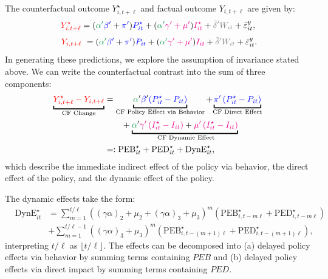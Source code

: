 \documentclass[11pt,reqno,letter]{amsart}
\theoremstyle{definition}
\def\bcolor{\color{ForestGreen}}
\def\pcolor{\color{blue}}
\def\icolor{\color{magenta}}
\def\wcolor{\color{gray}}
\def\ycolor{\color{red}}
\begin{document}
The counterfactual outcome $Y^\star_{i,t+\ell}$  and  factual outcome $Y_{i,t+\ell}$  are given by:
$$
 {\ycolor Y^\star_{i,t+\ell}} = ( {\bcolor\alpha '} {\pcolor \beta'}  + {\pcolor\pi'})
    {\pcolor P^\star_{it}} + ({\bcolor\alpha '}  {\icolor \gamma' + \mu'})
    {\icolor I^\star_{it} }+ {\wcolor \bar \delta 'W_{it}} + \bar \varepsilon_{it}^y, $$$$\ {\ycolor Y_{i,t+\ell}} \ =
    ( {\bcolor\alpha '}  {\pcolor \beta'} + {\pcolor\pi'})
    {\pcolor P_{it}} + ({\bcolor\alpha '}  {\icolor \gamma' + \mu'})
    {\icolor I_{it} }+ {\wcolor \bar \delta 'W_{it}} + \bar \varepsilon_{it}^y.
$$
In generating these predictions, we explore the assumption of invariance stated above.
We can write  the counterfactual contrast into the sum of three components:
  \begin{align}
 \underbracket{{\ycolor Y^\star_{i,t+\ell} -  Y_{i,t+\ell} }}_{\text{CF Change}} & =
\underbracket{{\bcolor\alpha}' {\pcolor\beta}' {\pcolor\left(P^\star_{it} - P_{it} \right)}}_{\text{CF Policy Effect via Behavior}}  +    {\underbracket{\pcolor\pi' \left( P^\star_{it} -  P_{it} \right)}_{\text{CF Direct  Effect}} } \nonumber\\
&\qquad +  {\underbracket{{\bcolor\alpha}' {\icolor{\gamma}'  \left( I^\star_{it} - I_{it} \right)}+ {\icolor{\mu}'  \left( I^\star_{it} -  I_{it} \right)}}_{\text{ CF Dynamic Effect}}} \nonumber \\
 & =:   \mathrm{PEB}^\star_{it} + \mathrm{PED}^\star_{it} + \mathrm{DynE}^\star_{it}, \label{eqn:DC2}
  \end{align}
 which describe the immediate indirect effect of the policy via behavior, the direct effect of the policy, and the dynamic effect
 of the policy.

The dynamic effects take the form:
$$
\begin{array}{lll}
  & \mathrm{DynE}^\star_{it} &=
  \sum_{m=1}^{t/\ell} \left( (\gamma \alpha)_2 + \mu_2+  (\gamma \alpha)_3+ \mu_3    \right)^m \left(\mathrm{PEB}^\star_{i,t-m \ell } +  \mathrm{PED}^\star_{i,t- m\ell} \right)
  \\
 &&  + \sum_{m=1}^{t/\ell-1} \left( (\gamma \alpha)_3 + \mu_3    \right)^m \left (\mathrm{PEB}^\star_{i,t-(m +1) \ell } +  \mathrm{PED}^\star_{i,t- (m+1)\ell}  \right),
 \end{array}
 $$
 interpreting $t/\ell$ as $\lfloor t/\ell \rfloor$.  %
 The effects can be decomposed into (a) delayed policy effects via behavior by
summing terms containing $PEB$ and (b) delayed policy effects via direct impact
by summing terms containing $PED$.
\end{document}
